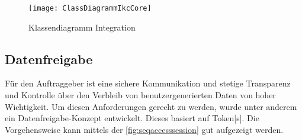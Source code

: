     \begin{figure}[H]
    \centering
    \texttt{[image: ClassDiagrammIkcCore]}
    \caption{Klassendiagramm Integration}
    \label{fig:classDiagrammIkcCore}
    \end{figure}

\subsection{Datenfreigabe}
Für den Auftraggeber ist eine sichere Kommunikation und stetige Transparenz und Kontrolle über den Verbleib von benutzergenerierten Daten von hoher Wichtigkeit. Um diesen Anforderungen gerecht zu werden, wurde unter anderem ein Datenfreigabe-Konzept entwickelt. Dieses basiert auf \gls{Token}[s]. Die Vorgehensweise kann mittels der \autoref{fig:seqaccesssession} gut aufgezeigt werden.

